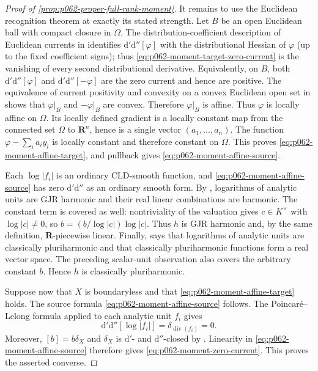 \begin{proof}[Proof of
\cref{prop:p062-proper-full-rank-moment}]
It remains to use the Euclidean recognition theorem at exactly its stated
strength.  Let $B$ be an open Euclidean ball with compact closure in
$\Omega$.  The distribution-coefficient description of Euclidean currents
in \cite[\S1.6.4]{CLD25} identifies
$\mathrm d'\mathrm d''[\varphi]$ with the distributional Hessian of
$\varphi$ (up to the fixed coefficient signs); thus
\eqref{eq:p062-moment-target-zero-current} is the vanishing of every second
distributional derivative.  Equivalently, on $B$, both
$\mathrm d'\mathrm d''[\varphi]$ and
$\mathrm d'\mathrm d''[-\varphi]$ are the zero current and hence are
positive.  The equivalence of current positivity and convexity on a convex
Euclidean open set in \cite[Proposition~8.3.2]{CLD25} shows that
$\varphi|_B$ and $-\varphi|_B$ are convex.  Therefore $\varphi|_B$ is
affine.  Thus $\varphi$ is locally affine on $\Omega$.  Its locally defined
gradient is a locally constant map from the connected set $\Omega$ to
$\mathbf R^n$, hence is a single vector $(a_1,\ldots,a_n)$.  The function
$\varphi-\sum_i a_i y_i$ is locally constant and therefore constant on
$\Omega$.  This proves \eqref{eq:p062-moment-affine-target}, and pullback
gives \eqref{eq:p062-moment-affine-source}.

Each $\log|f_i|$ is an ordinary CLD-smooth function, and
\eqref{eq:p062-moment-affine-source} has zero
$\mathrm d'\mathrm d''$ as an ordinary smooth form.  By
\cite[Definition~7.2 and Remark~7.3(5),(6)]{GJR26}, logarithms of analytic
units are GJR harmonic and their real linear combinations are harmonic.
The constant term is covered as well: nontriviality of the valuation gives
$c\in K^\times$ with $\log|c|\ne0$, so
$b=(b/\log|c|)\log|c|$.  Thus $h$ is GJR harmonic and, by the same
definition, $\mathbf R$-piecewise linear.  Finally,
\cite[Proposition~7.2(2),(3)]{GR25Classical} says that logarithms of analytic
units are classically pluriharmonic and that classically pluriharmonic
functions form a real vector space.  The preceding scalar-unit observation
also covers the arbitrary constant $b$.  Hence $h$ is classically
pluriharmonic.

Suppose now that $X$ is boundaryless and that
\eqref{eq:p062-moment-affine-target} holds.  The source formula
\eqref{eq:p062-moment-affine-source} follows.  The Poincar\'e--Lelong formula
\cite[Theorem~16.7.3]{CLD25} applied to each analytic unit $f_i$ gives
\begin{equation}
\label{eq:p062-moment-unit-zero-current}
                 \mathrm d'\mathrm d''[\log|f_i|]
                 =\delta_{\operatorname{div}(f_i)}=0.
\end{equation}
Moreover, $[b]=b\delta_X$ and $\delta_X$ is
$\mathrm d'$- and $\mathrm d''$-closed by \cite[\S7.7.4]{CLD25}.
Linearity in \eqref{eq:p062-moment-affine-source} therefore gives
\eqref{eq:p062-moment-zero-current}.  This proves the asserted converse.
\end{proof}

